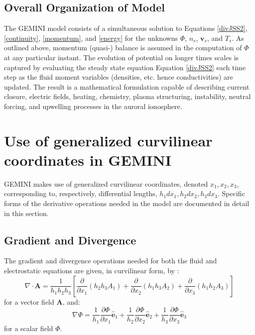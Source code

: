 \documentclass[11pt,letterpaper]{article}
\begin{document}
\subsection{Overall Organization of Model}

The GEMINI model consists of a simultaneous solution to Equations \ref{divJSS2}, \ref{continuity}, \ref{momentum}, and \ref{energy} for the unknowns $\Phi$, $n_s$, $\mathbf{v}_s$, and $T_s$.  As outlined above, momentum (quasi-) balance is assumed in the computation of $\Phi$ at any particular instant.  The evolution of potential on longer times scales is captured by evaluating the steady state equation Equation \ref{divJSS2} each time step as the fluid moment variables (densities, etc. hence conductivities) are updated.  The result is a mathematical formulation capable of describing current closure, electric fields, heating, chemistry, plasma structuring, instability, neutral forcing, and upwelling processes in the auroral ionosphere.  

\section{Use of generalized curvilinear coordinates in GEMINI}

GEMINI makes use of generalized curvilinear coordinates, denoted $x_1,x_2,x_3$, corresponding to, respectively, differential lengths, $h_1 dx_1,h_2 dx_2,h_3 dx_3$.  Specific forms of the derivative operations needed in the model are documented in detail in this section.  


\subsection{Gradient and Divergence}

The gradient and divergence operations needed for both the fluid and electrostatic equations are given, in curvilinear form, by \citep[e.g.][]{Huba:1998}:
\begin{equation}
\nabla \cdot \mathbf{A} = \frac{1}{h_1 h_2 h_3} \left[ \frac{\partial}{\partial x_1} \left( h_2 h_3 A_1 \right) + \frac{\partial}{\partial x_2} \left( h_1 h_3 A_2 \right) + \frac{\partial}{\partial x_3} \left( h_1 h_2 A_3 \right) \right]
\end{equation}
for a vector field $\mathbf{A}$, and:
\begin{equation}
\nabla \Phi = \frac{1}{h_1} \frac{\partial \Phi}{\partial x_1} \hat{\mathbf{e}}_1 + \frac{1}{h_2} \frac{\partial \Phi}{\partial x_2} \hat{\mathbf{e}}_2 + \frac{1}{h_3} \frac{\partial \Phi}{\partial x_3} \hat{\mathbf{e}}_3
\end{equation}
for a scalar field $\Phi$.  
\end{document}

